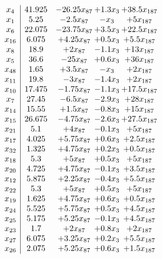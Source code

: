\documentclass[11pt]{article}
\begin{document}
\[\begin{array}{c| c c@{\hskip 2pt} c@{\hskip 2pt} c@{\hskip 2pt} }
 x_{4}   &  41.925 & -26.25 x_{87} & + 1.3 x_{3} & + 38.5 x_{187}\\
 x_{1}   &  5.25 & -2.5 x_{87} & - x_{3} & + 5 x_{187}\\
 x_{6}   &  22.075 & -23.75 x_{87} & + 3.5 x_{3} & + 22.5 x_{187}\\
 x_{16}   &  6.075 & + 4.25 x_{87} & + 0.5 x_{3} & + 5.5 x_{187}\\
 x_{8}   &  18.9 & + 2 x_{87} & -1.1 x_{3} & + 13 x_{187}\\
 x_{5}   &  36.6 & -25 x_{87} & + 0.6 x_{3} & + 36 x_{187}\\
 x_{48}   &  1.65 & + 3.5 x_{87} & - x_{3} & + 2 x_{187}\\
 x_{11}   &  19.8 & -3 x_{87} & -1.4 x_{3} & + 2 x_{187}\\
 x_{10}   &  17.475 & -1.75 x_{87} & -1.1 x_{3} & + 17.5 x_{187}\\
 x_{7}   &  27.45 & -6.5 x_{87} & -2.9 x_{3} & + 28 x_{187}\\
 x_{14}   &  15.55 & + 1.5 x_{87} & -0.8 x_{3} & + 15 x_{187}\\
 x_{15}   &  26.675 & -4.75 x_{87} & -2.6 x_{3} & + 27.5 x_{187}\\
 x_{21}   &  5.1 & + 4 x_{87} & -0.1 x_{3} & + 5 x_{187}\\
 x_{17}   &  4.025 & + 5.75 x_{87} & + 0.6 x_{3} & + 2.5 x_{187}\\
 x_{32}   &  1.325 & + 4.75 x_{87} & + 0.2 x_{3} & + 0.5 x_{187}\\
 x_{18}   &  5.3 & + 5 x_{87} & + 0.5 x_{3} & + 5 x_{187}\\
 x_{20}   &  4.725 & + 4.75 x_{87} & -0.1 x_{3} & + 3.5 x_{187}\\
 x_{12}   &  5.875 & + 2.25 x_{87} & -0.4 x_{3} & + 5.5 x_{187}\\
 x_{22}   &  5.3 & + 5 x_{87} & + 0.5 x_{3} & + 5 x_{187}\\
 x_{19}   &  1.625 & + 4.75 x_{87} & + 0.6 x_{3} & + 0.5 x_{187}\\
 x_{24}   &  5.525 & + 5.75 x_{87} & + 0.5 x_{3} & + 4.5 x_{187}\\
 x_{25}   &  5.175 & + 5.25 x_{87} & -0.1 x_{3} & + 4.5 x_{187}\\
 x_{23}   &  1.7 & + 2 x_{87} & + 0.8 x_{3} & + 2 x_{187}\\
 x_{27}   &  6.075 & + 3.25 x_{87} & + 0.2 x_{3} & + 5.5 x_{187}\\
 x_{26}   &  2.075 & + 5.25 x_{87} & + 0.6 x_{3} & + 1.5 x_{187}\\

\end{array}\]
\end{document}
